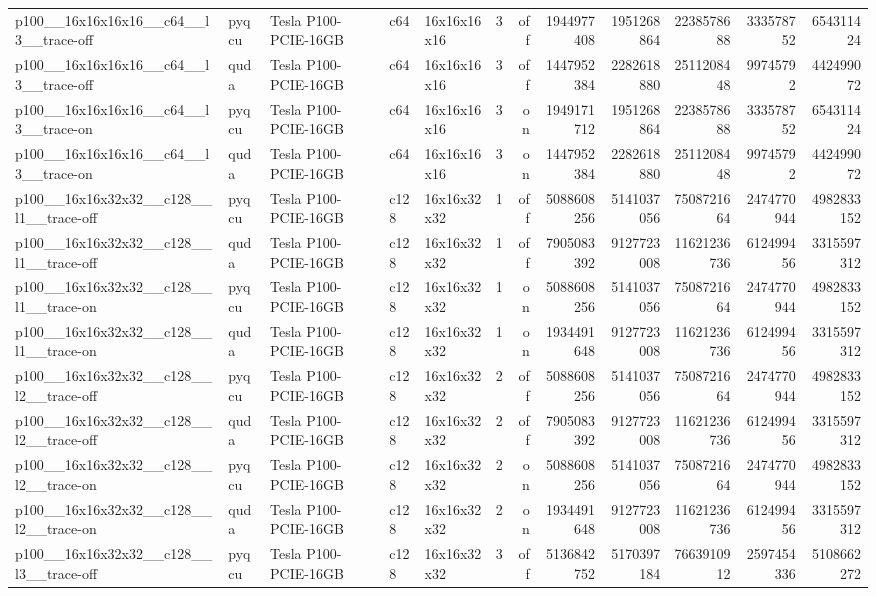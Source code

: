 \begin{table}[htbp]
\begin{tabular}{@{}lllllrrrrrrr@{}}
p100\_\_16x16x16x16\_\_c64\_\_l3\_\_trace-off & pyqcu & Tesla P100-PCIE-16GB & c64 & 16x16x16x16 & 3 & off & 1944977408 & 1951268864 & 2238578688 & 333578752 & 654311424 \\
p100\_\_16x16x16x16\_\_c64\_\_l3\_\_trace-off & quda & Tesla P100-PCIE-16GB & c64 & 16x16x16x16 & 3 & off & 1447952384 & 2282618880 & 2511208448 & 99745792 & 442499072 \\
p100\_\_16x16x16x16\_\_c64\_\_l3\_\_trace-on & pyqcu & Tesla P100-PCIE-16GB & c64 & 16x16x16x16 & 3 & on & 1949171712 & 1951268864 & 2238578688 & 333578752 & 654311424 \\
p100\_\_16x16x16x16\_\_c64\_\_l3\_\_trace-on & quda & Tesla P100-PCIE-16GB & c64 & 16x16x16x16 & 3 & on & 1447952384 & 2282618880 & 2511208448 & 99745792 & 442499072 \\
p100\_\_16x16x32x32\_\_c128\_\_l1\_\_trace-off & pyqcu & Tesla P100-PCIE-16GB & c128 & 16x16x32x32 & 1 & off & 5088608256 & 5141037056 & 7508721664 & 2474770944 & 4982833152 \\
p100\_\_16x16x32x32\_\_c128\_\_l1\_\_trace-off & quda & Tesla P100-PCIE-16GB & c128 & 16x16x32x32 & 1 & off & 7905083392 & 9127723008 & 11621236736 & 612499456 & 3315597312 \\
p100\_\_16x16x32x32\_\_c128\_\_l1\_\_trace-on & pyqcu & Tesla P100-PCIE-16GB & c128 & 16x16x32x32 & 1 & on & 5088608256 & 5141037056 & 7508721664 & 2474770944 & 4982833152 \\
p100\_\_16x16x32x32\_\_c128\_\_l1\_\_trace-on & quda & Tesla P100-PCIE-16GB & c128 & 16x16x32x32 & 1 & on & 1934491648 & 9127723008 & 11621236736 & 612499456 & 3315597312 \\
p100\_\_16x16x32x32\_\_c128\_\_l2\_\_trace-off & pyqcu & Tesla P100-PCIE-16GB & c128 & 16x16x32x32 & 2 & off & 5088608256 & 5141037056 & 7508721664 & 2474770944 & 4982833152 \\
p100\_\_16x16x32x32\_\_c128\_\_l2\_\_trace-off & quda & Tesla P100-PCIE-16GB & c128 & 16x16x32x32 & 2 & off & 7905083392 & 9127723008 & 11621236736 & 612499456 & 3315597312 \\
p100\_\_16x16x32x32\_\_c128\_\_l2\_\_trace-on & pyqcu & Tesla P100-PCIE-16GB & c128 & 16x16x32x32 & 2 & on & 5088608256 & 5141037056 & 7508721664 & 2474770944 & 4982833152 \\
p100\_\_16x16x32x32\_\_c128\_\_l2\_\_trace-on & quda & Tesla P100-PCIE-16GB & c128 & 16x16x32x32 & 2 & on & 1934491648 & 9127723008 & 11621236736 & 612499456 & 3315597312 \\
p100\_\_16x16x32x32\_\_c128\_\_l3\_\_trace-off & pyqcu & Tesla P100-PCIE-16GB & c128 & 16x16x32x32 & 3 & off & 5136842752 & 5170397184 & 7663910912 & 2597454336 & 5108662272 \\

\end{tabular}
\end{table}
